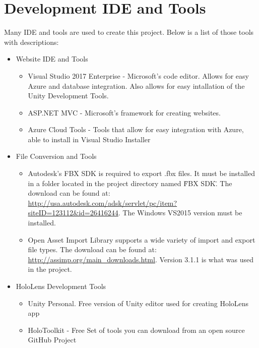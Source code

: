 \section{Development IDE and Tools}
Many IDE and tools are used to create this project. Below is a list of those
tools with descriptions:

\begin{itemize}

    \item Website IDE and Tools
    \begin{itemize}
        \item Visual Studio 2017 Enterprise - Microsoft's code editor. Allows for easy Azure and database
        integration. Also allows for easy intallation of the Unity Development Tools.
        \item ASP.NET MVC - Microsoft's framework for creating websites.
        \item Azure Cloud Tools - Tools that allow for easy integration with Azure, able to install in Visual Studio Installer
    \end{itemize}

    \item File Conversion and Tools
    \begin{itemize}
        \item Autodesk's FBX SDK is required to export .fbx files.  It must be installed in a folder located in the project directory named \"FBX SDK\".  The download can be found at: 
        \url{http://usa.autodesk.com/adsk/servlet/pc/item?siteID=123112&id=26416244}.
        The Windows VS2015 version must be installed.

        \item Open Asset Import Library supports a wide variety of import and export file types.  The download can be found at: \url{http://assimp.org/main_downloads.html}.  Version 3.1.1 is what was used in the project.         
    \end{itemize}

    \item HoloLens Development Tools
    \begin{itemize}
        \item Unity Personal. Free version of Unity editor used for creating HoloLens app

        \item HoloToolkit - Free Set of tools you can download from an open source GitHub Project

    \end{itemize}
\end{itemize}


